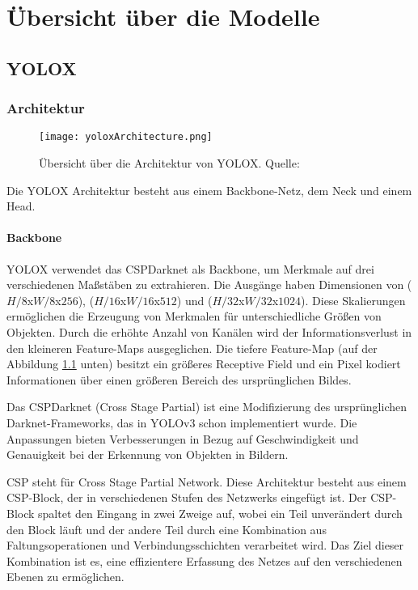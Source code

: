 \chapter{Übersicht über die Modelle}
\section{YOLOX}\label{chap:yolox}
\subsection{Architektur}

\begin{figure}[h]
	\centering
	\texttt{[image: yoloxArchitecture.png]}
	\caption[Übersicht über die Architektur von YOLOX]{Übersicht über die Architektur von YOLOX. Quelle: \cite{yoloArchitecture, yoloxPaper, yoloxGitHubRepo}}
	\label{fig:yoloxArchitecture.png}
\end{figure}

Die YOLOX Architektur besteht aus einem Backbone-Netz, dem Neck und einem Head.

\subsubsection{Backbone}
YOLOX verwendet das CSPDarknet als Backbone, um Merkmale auf drei verschiedenen Maßstäben zu extrahieren. Die Ausgänge haben Dimensionen von ($H/8$x$W/8$x$256$), ($H/16$x$W/16$x$512$) und ($H/32$x$W/32$x$1024$). Diese Skalierungen ermöglichen die Erzeugung von Merkmalen für unterschiedliche Größen von Objekten. Durch die erhöhte Anzahl von Kanälen wird der Informationsverlust in den kleineren Feature-Maps ausgeglichen. Die tiefere Feature-Map (auf der Abbildung \ref{fig:yoloxArchitecture.png} unten) besitzt ein größeres Receptive Field und ein Pixel kodiert Informationen über einen größeren Bereich des ursprünglichen Bildes.

Das CSPDarknet (Cross Stage Partial) ist eine Modifizierung des ursprünglichen Darknet-Frameworks, das in YOLOv3 schon implementiert wurde. Die Anpassungen bieten Verbesserungen in Bezug auf Geschwindigkeit und Genauigkeit bei der Erkennung von Objekten in Bildern.

CSP steht für Cross Stage Partial Network. Diese Architektur besteht aus einem CSP-Block, der in verschiedenen Stufen des Netzwerks eingefügt ist. Der CSP-Block spaltet den Eingang in zwei Zweige auf, wobei ein Teil unverändert durch den Block läuft und der andere Teil durch eine Kombination aus Faltungsoperationen und Verbindungsschichten verarbeitet wird. Das Ziel dieser Kombination ist es, eine effizientere Erfassung des Netzes auf den verschiedenen Ebenen zu ermöglichen.

